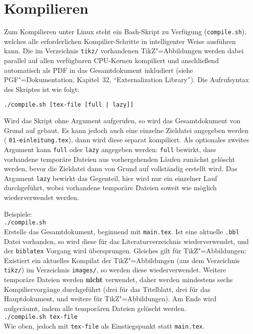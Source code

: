 \section{Kompilieren}\label{sec:kompilieren}
%
Zum Kompilieren unter Linux steht ein Bash-Skript zu Verfügung (\texttt{compile.sh}), welches alle erforderlichen Kompilier-Schritte in intelligenter Weise ausführen kann. Die im Verzeichnis \texttt{tikz/} vorhandenen TikZ"=Abbildungen werden dabei parallel auf allen verfügbaren CPU-Kernen kompiliert und anschließend automatisch als PDF in das Gesamtdokument inkludiert (siehe PGF"=Dokumentation, Kapitel~32, \enquote{Externalization Library}). Die Aufrufsyntax des Skriptes ist wie folgt:
%
\begin{center}
  \texttt{./compile.sh [tex-file [full | lazy]]}
\end{center}
%
Wird das Skript ohne Argument aufgerufen, so wird das Gesamtdokument von Grund auf gebaut. Es kann jedoch auch eine einzelne Zieldatei angegeben werden (\zB{} \texttt{01-einleitung.tex}), dann wird diese separat kompiliert. Als optionales zweites Argument kann \texttt{full} oder \texttt{lazy} angegeben werden: \texttt{full} bewirkt, dass \ggf{} vorhandene temporäre Dateien aus vorhergehenden Läufen zunächst gelöscht werden, bevor die Zieldatei dann von Grund auf vollständig erstellt wird. Das Argument \texttt{lazy} bewirkt das Gegenteil, hier wird nur ein einzelner Lauf durchgeführt, wobei vorhandene temporäre Dateien soweit wie möglich wiederverwendet werden.
%
\\\par\noindent Beispiele:\\[1em]
%
\texttt{./compile.sh}\\Erstelle das Gesamtdokument, beginnend mit \texttt{main.tex}. Ist eine aktuelle \texttt{.bbl} Datei vorhanden, so wird diese für das Literaturverzeichnis wiederverwendet, und der \texttt{biblatex} Vorgang wird übersprungen. Gleiches gilt für TikZ"=Abbildungen: Existiert ein aktuelles Kompilat der TikZ"=Abbildungen (aus dem Verzeichnis \texttt{tikz/}) im Verzeichnis \texttt{images/}, so werden diese wiederverwendet. Weitere temporäre Dateien werden \textbf{nicht} verwendet, daher werden mindestens sechs Kompiliervorgänge durchgeführt (drei für das Titelblatt, drei für das Hauptdokument, und \ggf{} weitere für TikZ"=Abbildungen). Am Ende wird aufgeräumt, indem alle temporären Dateien gelöscht werden.\\[1em]
%
\texttt{./compile.sh tex-file}\\Wie oben, jedoch mit \texttt{tex-file} als Einstiegspunkt statt \texttt{main.tex}.\\[1em]
